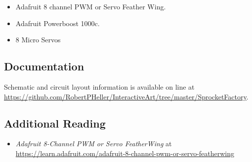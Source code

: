 \begin{itemize}
\item Adafruit 8 channel PWM or Servo Feather Wing.
\item Adafruit Powerboost 1000c.
\item 8 Micro Servos
\end{itemize}

\subsection*{Documentation}

Schematic and circuit layout information is available on line at 
\url{https://github.com/RobertPHeller/InteractiveArt/tree/master/SprocketFactory}.

\subsection*{Additional Reading}

\begin{itemize}
\item \textit{Adafruit 8-Channel PWM or Servo FeatherWing} at 
\url{https://learn.adafruit.com/adafruit-8-channel-pwm-or-servo-featherwing} 
\end{itemize}
